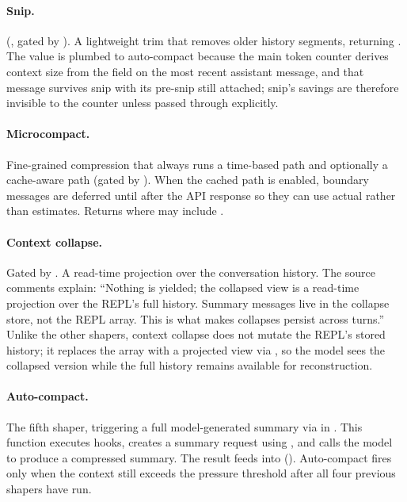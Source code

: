 \paragraph{Snip.} (, gated by ).
A lightweight trim that removes older history segments, returning . The  value is plumbed to auto-compact because the main token counter derives context size from the  field on the most recent assistant message, and that message survives snip with its pre-snip  still attached; snip's savings are therefore invisible to the counter unless passed through explicitly.

\paragraph{Microcompact.}
Fine-grained compression that always runs a time-based path and optionally a cache-aware path (gated by ). When the cached path is enabled, boundary messages are deferred until after the API response so they can use actual  rather than estimates. Returns  where  may include .

\paragraph{Context collapse.} Gated by .
A read-time projection over the conversation history. The source comments explain: ``Nothing is yielded; the collapsed view is a read-time projection over the REPL's full history. Summary messages live in the collapse store, not the REPL array. This is what makes collapses persist across turns.'' Unlike the other shapers, context collapse does not mutate the REPL's stored history; it replaces the  array with a projected view via , so the model sees the collapsed version while the full history remains available for reconstruction.

\paragraph{Auto-compact.}
The fifth shaper, triggering a full model-generated summary via  in . This function executes  hooks, creates a summary request using , and calls the model to produce a compressed summary. The result feeds into  (). Auto-compact fires only when the context still exceeds the pressure threshold after all four previous shapers have run.


